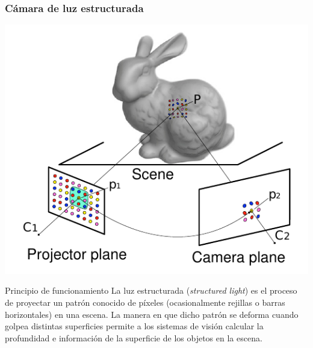 \begin{frame}
    \frametitle{Cámara de luz estructurada}
    \small
    \begin{center}
        \includegraphics[width=0.4\columnwidth]{images/structured_light.pdf}
    \end{center}

    \begin{block}{Principio de funcionamiento}
        La luz estructurada (\emph{structured light}) es el proceso de proyectar un patrón conocido de píxeles (ocasionalmente rejillas o barras horizontales) en una escena. La manera en que dicho patrón se deforma cuando golpea distintas superficies permite a los sistemas de visión calcular la profundidad e información de la superficie de los objetos en la escena.
    \end{block}


\end{frame}
